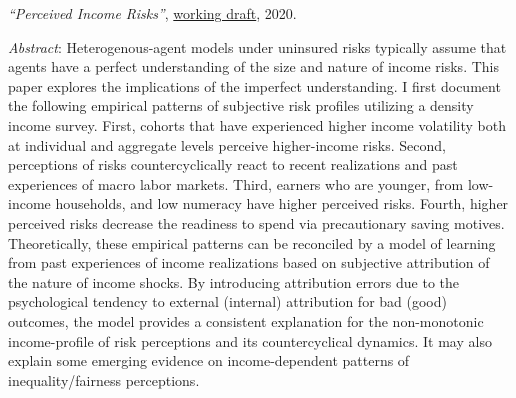 \documentclass[12pt]{article}
\newenvironment{innerlist}[1][\enskip$\circ$]%
        {\begin{compactitem}[#1]}{\end{compactitem}}
\begin{document}
\begin{enumerate}
\begin{innerlist}
\end{innerlist}
\item  \textit{``Perceived Income Risks''}, \href{https://github.com/iworld1991/IncExpProject/blob/master/WorkingFolder/PythonCode/latex/PerceivedIncomeRisk.pdf}{working draft}, 2020.
\begin{innerlist}
\item[] \textit{Abstract}: Heterogenous-agent models under uninsured risks typically assume that agents have a perfect understanding of the size and nature of income risks. This paper explores the implications of the imperfect understanding. I first document the following empirical patterns of subjective risk profiles utilizing a density income survey. First, cohorts that have experienced higher income volatility both at individual and aggregate levels perceive higher-income risks. Second, perceptions of risks countercyclically react to recent realizations and past experiences of macro labor markets. Third, earners who are younger, from low-income households, and low numeracy have higher perceived risks. Fourth, higher perceived risks decrease the readiness to spend via precautionary saving motives. Theoretically, these empirical patterns can be reconciled by a model of learning from past experiences of income realizations based on subjective attribution of the nature of income shocks. By introducing attribution errors due to the psychological tendency to external (internal) attribution for bad (good) outcomes, the model provides a consistent explanation for the non-monotonic income-profile of risk perceptions and its countercyclical dynamics. It may also explain some emerging evidence on income-dependent patterns of inequality/fairness perceptions.
\end{innerlist}


\end{enumerate}
\end{document}
